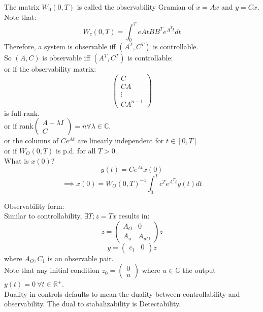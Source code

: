 \documentclass{article}
\begin{document}
The matrix $W_0(0,T)$ is called the observability Gramian of $\dot{x}=Ax$ and $y=Cx$. Note that:\\
\[W_c(0,T)=\int_0^Te{At}BB^Te^{A^Tt}dt\]
Therefore, a system is observable iff $(A^T, C^T)$ is controllable.\\

So $(A,C)$ is observable iff $(A^T,C^T)$ is controllable:\\
or if the observability matrix:\\
\[\begin{pmatrix}C\\CA\\\vdots\\CA^{n-1}\end{pmatrix}\]
is full rank.\\
or if rank$\begin{pmatrix}A-\lambda I\\C\end{pmatrix}=n\forall \lambda\in \mathbb{C}$.\\
or the columns of $Ce^{At}$ are linearly independent for $t\in[0,T]$\\
or if $W_O(0,T)$ is p.d. for all $T>0$.\\

What is $x(0)$?\\
\[y(t)=Ce^{At}x(0)\]
\[\implies x(0)=W_O(0,T)^{-1}\int_0^Tc^Te^{A^Tt}y(t)dt\]

Observability form:\\
Similar to controllability, $\exists T; z=Tx$ results in:
\[z=\begin{pmatrix}A_O&0\\A_u&A_{uO}\end{pmatrix}z\]
\[y=\begin{pmatrix}c_1 &0\end{pmatrix}z\]
where $A_O, C_1$ is an observable pair.\\
Note that any initial condition $z_0=\begin{pmatrix}0\\u\end{pmatrix}$ where $u\in\mathbb{C}$ the output $y(t)=0\ \forall t\in\mathbb{R^+}$.\\

Duality in controls defaults to mean the duality between controllability and observability. The dual to stabalizability is Detectability.
\end{document}
